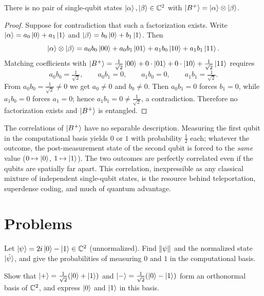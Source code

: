 \begin{theorem}\label{l1:thm:bell}
There is no pair of single-qubit states $\ket{\alpha},\ket{\beta}\in\mathbb{C}^{2}$ with
$\ket{B^{+}}=\ket{\alpha}\otimes\ket{\beta}$.
\end{theorem}

\begin{proof}
Suppose for contradiction that such a factorization exists. Write
$\ket{\alpha}=a_0\ket{0}+a_1\ket{1}$ and $\ket{\beta}=b_0\ket{0}+b_1\ket{1}$. Then
\[
  \ket{\alpha}\otimes\ket{\beta}
    =a_0 b_0\ket{00}+a_0 b_1\ket{01}+a_1 b_0\ket{10}+a_1 b_1\ket{11}.
\]
Matching coefficients with $\ket{B^{+}}=\tfrac{1}{\sqrt2}\ket{00}+0\cdot\ket{01}+0\cdot\ket{10}+\tfrac{1}{\sqrt2}\ket{11}$ requires
\[
  a_0 b_0=\tfrac{1}{\sqrt2},\qquad a_0 b_1=0,\qquad a_1 b_0=0,\qquad a_1 b_1=\tfrac{1}{\sqrt2}.
\]
From $a_0 b_0=\tfrac{1}{\sqrt2}\neq0$ we get $a_0\neq0$ and $b_0\neq0$. Then
$a_0 b_1=0$ forces $b_1=0$, while $a_1 b_0=0$ forces $a_1=0$; hence
$a_1 b_1=0\neq\tfrac{1}{\sqrt2}$, a contradiction. Therefore no factorization exists
and $\ket{B^{+}}$ is entangled.
\end{proof}

\begin{remark}
The correlations of $\ket{B^{+}}$ have no separable description. Measuring the first
qubit in the computational basis yields $0$ or $1$ with probability $\tfrac12$ each;
whatever the outcome, the post-measurement state of the second qubit is forced to the
\emph{same} value ($0\mapsto\ket{0}$, $1\mapsto\ket{1}$). The two outcomes are
perfectly correlated even if the qubits are spatially far apart. This correlation,
inexpressible as any classical mixture of independent single-qubit states, is the
resource behind teleportation, superdense coding, and much of quantum advantage.
\end{remark}

\section{Problems}

\begin{exercise}\label{l1:ex:norm}
Let $\ket{\psi}=2i\ket{0}-\ket{1}\in\mathbb{C}^{2}$ (unnormalized). Find $\lVert\psi\rVert$ and
the normalized state $\ket{\hat\psi}$, and give the probabilities of measuring $0$
and $1$ in the computational basis.
\end{exercise}

\begin{exercise}\label{l1:ex:orth}
Show that $\ket{+}=\tfrac{1}{\sqrt2}(\ket{0}+\ket{1})$ and
$\ket{-}=\tfrac{1}{\sqrt2}(\ket{0}-\ket{1})$ form an orthonormal basis of $\mathbb{C}^{2}$,
and express $\ket{0}$ and $\ket{1}$ in this basis.
\end{exercise}

